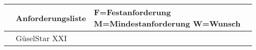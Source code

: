 \begin{tabular}{|p{4cm}|p{6cm}|p{3.8cm}|}\hline
     &   \huge{Anforderungsliste} & F=Festanforderung M=Mindestanforderung W=Wunsch \\\hline
     &   GüselStar XXI            &  \\\hline
\end{tabular}\\[0.5cm]